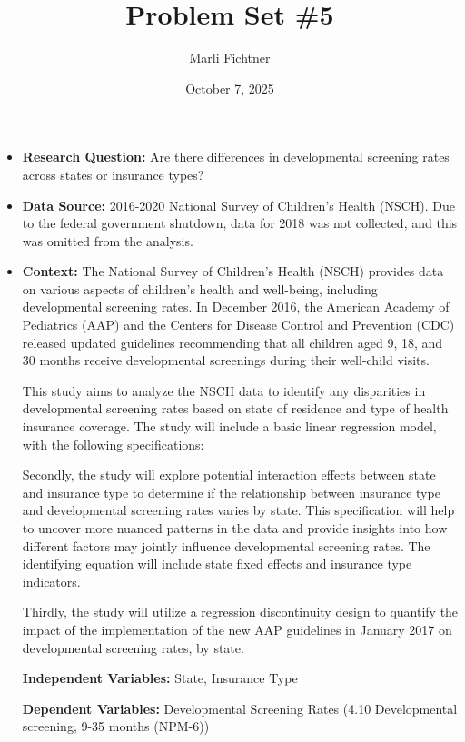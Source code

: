 \documentclass[11pt]{article}
\title{Problem Set \#5}
\author{Marli Fichtner}
\date{October 7, 2025}
\begin{document}
\maketitle

\begin{itemize}
\item 
    \textbf{Research Question:} Are there differences in developmental screening rates across states or insurance types?

\item 
    \textbf{Data Source:} 2016-2020 National Survey of Children's Health (NSCH). Due to the federal government shutdown, data for 2018 was not collected, and this was omitted from the analysis.

    \item
\textbf{Context:} The National Survey of Children's Health (NSCH) provides data on various aspects of children's health and well-being, including developmental screening rates. In December 2016, the American Academy of Pediatrics (AAP) and the Centers for Disease Control and Prevention (CDC) released updated guidelines recommending that all children aged 9, 18, and 30 months receive developmental screenings during their well-child visits.

This study aims to analyze the NSCH data to identify any disparities in developmental screening rates based on state of residence and type of health insurance coverage. The study will include a basic linear regression model, with the following specifications:

Secondly, the study will explore potential interaction effects between state and insurance type to determine if the relationship between insurance type and developmental screening rates varies by state. This specification will help to uncover more nuanced patterns in the data and provide insights into how different factors may jointly influence developmental screening rates. The identifying equation will include state fixed effects and insurance type indicators.

Thirdly, the study will utilize a regression discontinuity design to quantify the impact of the implementation of the new AAP guidelines in January 2017 on developmental screening rates, by state.

\textbf{Independent Variables:} State, Insurance Type

\textbf{Dependent Variables:} Developmental Screening Rates (4.10 Developmental screening, 9-35 months (NPM-6))

\end{itemize}
\end{document}
